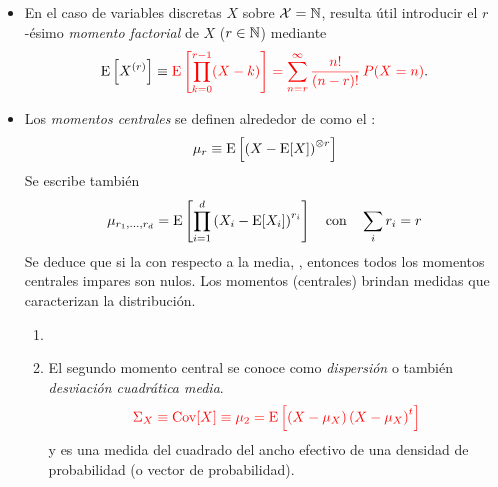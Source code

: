 \begin{itemize}
{  normalizaci\'on}, no tiene momentos finitos de orden $r \geq 1$.
%
\item En el  caso de variables discretas $X$ sobre $\mathcal{X}  = \mathbb{N}$, resulta \'util
  introducir el $r$-\'esimo {\it momento factorial} de $X$ ($r \in \mathbb{N}$) mediante
  \[
  \operatorname{E}\left[ X^{(r)} \right] \equiv  {\color{red} \operatorname{E}\left[ \prod_{k=0}^{r-1} (X-k) \right]
  = \sum_{n = r}^\infty \frac{n!}{(n-r)!} \, P(X = n)}.
 \]
%
\item  Los  {\it  momentos  centrales}    se  definen
  alrededor de   como  el :
  \[
  \mu_r \equiv \operatorname{E}\left[  \left( X - \operatorname{E}[X] \right)^{\otimes r} \right]
  \]
  Se escribe tambi\'en
  \[
  \mu_{r_1,\ldots,r_d}   =   \operatorname{E}\left[   \prod_{i=1}^d   \left(   X_i-\operatorname{E}[X_i]
    \right)^{r_i} \right] \quad \mbox{con} \quad \sum_i r_i = r
  \]
  Se  deduce que  si la    con respecto a  la media, , entonces  todos  los  momentos
  centrales  impares son nulos.   Los momentos  (centrales) brindan  medidas que
  caracterizan la distribuci\'on.
  \begin{enumerate}
  \item {}
\item  El  segundo  momento  central   se  conoce  como    {\it
    dispersi\'on} o tambi\'en {\it desviaci\'on cuadr\'atica media}.
  \[
  {\color{red} \Sigma_X  \equiv \operatorname{Cov}[X]  \equiv \mu_2  = \operatorname{E}\left[  \left( X  - \mu_X
      \right) \left( X - \mu_X \right)^t \right]}
  \]
    y es  una  medida del  cuadrado del  ancho  efectivo de  una densidad  de
probabilidad (o vector  de probabilidad). 
\end{enumerate}
\end{itemize}
